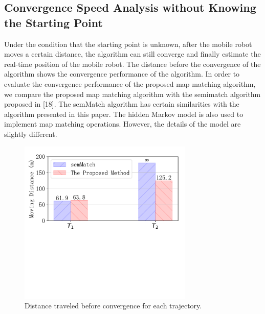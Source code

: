 \documentclass{llncs}
\begin{document}
\subsection{Convergence Speed Analysis without Knowing the Starting Point}

Under the condition that the starting point is unknown, after the mobile robot moves a certain distance, the algorithm can still converge and finally estimate the real-time position of the mobile robot. The distance before the convergence of the algorithm shows the convergence performance of the algorithm. In order to evaluate the convergence performance of the proposed map matching algorithm, we compare the proposed map matching algorithm with the semimatch algorithm proposed in [18]. The semMatch algorithm has certain similarities with the algorithm presented in this paper. The hidden Markov model is also used to implement map matching operations. However, the details of the model are slightly different.

\begin{figure}[!htbp]
	\centering
	\includegraphics[width=3.276in]{RobotMatch-Convergence}
	\caption{Distance traveled before convergence for each trajectory.}
	\label{fig-convergence}
\end{figure}
\end{document}
